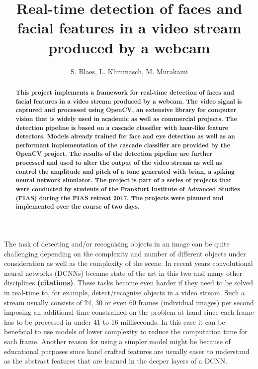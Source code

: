 \documentclass[11pt,a4paper]{article}
\begin{document}
\title{Real-time detection of faces and facial features in a video stream produced by a webcam}
\author{S. Blaes, L. Klimmasch, M. Murakami}
\date{}

\maketitle

\begin{abstract}
\bfseries{
\noindent This project implements a framework for real-time detection of faces and facial features in a video stream produced by a webcam. The video signal is captured and processed using OpenCV, an extensive library for computer vision that is widely used in academic as well as commercial projects. The detection pipeline is based on a cascade classifier with haar-like feature detectors. Models already trained for face and eye detection as well as an performant implementation of the cascade classifier are provided by the OpenCV project. The results of the detection pipeline are further processed and used to alter the output of the video stream as well as control the amplitude and pitch of a tone generated with brian, a spiking neural network simulator. The project is part of a series of projects that were conducted by students of the Frankfurt Institute of Advanced Studies (FIAS) during the FIAS retreat 2017. The projects were planned and implemented over the course of two days. 
}
\end{abstract}

\vspace{1.5cm}

The task of detecting and/or recognising objects in an image can be quite challenging depending on the complexity and number of different objects under consideration as well as the complexity of the scene. In recent years convolutional neural networks (DCNNs) became state of the art in this two and many other disciplines \textbf{(citations)}. These tasks become even harder if they need to be solved in real-time to, for example, detect/recognise objects in a video stream. Such a stream usually consists of 24, 30 or even 60 frames (individual images) per second imposing an additional time constrained on the problem at hand since each frame has to be processed in under 41 to 16 milliseconds. In this case it can be beneficial to use models of lower complexity to reduce the computation time for each frame. Another reason for using a simpler model might be because of educational purposes since hand crafted features are usually easer to understand as the abstract features that are learned in the deeper layers of a DCNN. 
\end{document}
